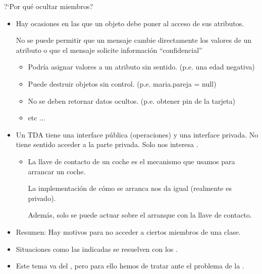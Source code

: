 \documentclass[10pt,envcountsect,spanish]{beamer}
\begin{document}
\begin{frame}{?`Por qué ocultar miembros?} 

\begin{itemize}

\item Hay ocasiones en las que un objeto debe poner  al acceso de sus atributos.

\unEjemplo No se puede permitir que un mensaje cambie directamente los valores de un atributo o que el mensaje solicite información ``confidencial''
	\begin{itemize}
	\item Podría asignar valores a un atributo sin sentido. (p.e. una edad negativa)
	\item Puede destruir objetos sin control. (p.e. maria.pareja = null)
	\item No se deben retornar datos ocultos. (p.e. obtener pin de la tarjeta)
	\item etc ...
	\end{itemize}	
	

\item Un TDA tiene una interface pública (operaciones) y una interface privada. No tiene sentido acceder a la parte privada. Solo nos interesa .

\unEjemplo 
	\begin{itemize}
	\item La llave de contacto de un coche es el mecanismo que usamos para arrancar un coche. 

	La implementación de cómo se arranca nos da igual (realmente es privado). 
	
	Además, solo se puede actuar sobre el arranque con la llave de contacto.
	\end{itemize}

\item Resumen: Hay motivos para no acceder a ciertos miembros de una clase.

\item Situaciones como las indicadas se resuelven con los .
\item Este tema va del , pero para ello hemos de tratar ante el problema de la .
\end{itemize}

\end{frame}
\end{document}
